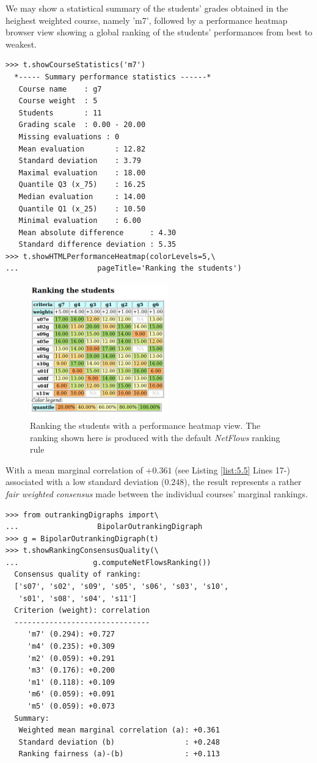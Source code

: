 We may show a statistical summary of the students' grades obtained in the heighest weighted course, namely 'm7', followed by a performance heatmap browser view showing a global ranking of the students' performances from best to weakest.
\begin{lstlisting}[caption={Student performance summary statistics per course},label=list:5.6]
>>> t.showCourseStatistics('m7')
  *----- Summary performance statistics ------*
   Course name    : g7
   Course weight  : 5
   Students       : 11
   Grading scale  : 0.00 - 20.00
   Missing evaluations : 0
   Mean evaluation       : 12.82
   Standard deviation    : 3.79
   Maximal evaluation    : 18.00
   Quantile Q3 (x_75)    : 16.25
   Median evaluation     : 14.00
   Quantile Q1 (x_25)    : 10.50
   Minimal evaluation    : 6.00
   Mean absolute difference      : 4.30
   Standard difference deviation : 5.35
>>> t.showHTMLPerformanceHeatmap(colorLevels=5,\
...                  pageTitle='Ranking the students')
\end{lstlisting}
\begin{figure}[h]
\sidecaption
\includegraphics[width=6cm]{Figures/rankingStudents.png}
\caption{Ranking the students with a performance heatmap view. The ranking shown here is produced with the default \emph{NetFlows} ranking rule}
\label{fig:5.4}       %
\end{figure}

With a mean marginal correlation of $+0.361$ (see Listing \ref{list:5.5} Lines 17-) associated with a low standard deviation ($0.248$), the result represents a rather \emph{fair weighted consensus} made between the individual courses' marginal rankings.
\begin{lstlisting}[caption={Consensus quality of the students's ranking},label=list:5.7]
>>> from outrankingDigraphs import\
...                  BipolarOutrankingDigraph
>>> g = BipolarOutrankingDigraph(t)
>>> t.showRankingConsensusQuality(\
...                 g.computeNetFlowsRanking())
  Consensus quality of ranking:
  ['s07', 's02', 's09', 's05', 's06', 's03', 's10',
   's01', 's08', 's04', 's11']
  Criterion (weight): correlation
  -------------------------------
     'm7' (0.294): +0.727
     'm4' (0.235): +0.309
     'm2' (0.059): +0.291
     'm3' (0.176): +0.200
     'm1' (0.118): +0.109
     'm6' (0.059): +0.091
     'm5' (0.059): +0.073
  Summary:
   Weighted mean marginal correlation (a): +0.361
   Standard deviation (b)                : +0.248
   Ranking fairness (a)-(b)              : +0.113
\end{lstlisting}
   
